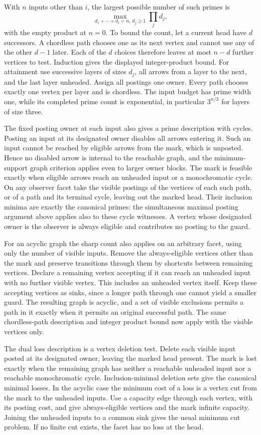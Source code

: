 With $n$ inputs other than $i$, the largest possible
number of such primes is
\[
        \max_{d_1+\cdots+d_t=n,\ d_j\ge1}\prod_j d_j ,
\]
with the empty product at $n=0$. To bound the count,
let a current head have $d$ successors. A chordless
path chooses one as its next vertex and cannot use
any of the other $d-1$ later. Each of the $d$ choices
therefore leaves at most $n-d$ further vertices to
test. Induction gives the displayed integer-product
bound. For attainment use successive layers of sizes
$d_j$, all arrows from a layer to the next, and the
last layer unheaded. Assign all postings one owner.
Every path chooses exactly one vertex per layer
and is chordless. The input budget has prime width
one, while its completed prime count is exponential,
in particular $3^{n/3}$ for layers of size three.

The fixed posting owner at each input also gives a
prime description with cycles. Posting an input at
its designated owner disables all arrows entering
it. Such an input cannot be reached by eligible
arrows from the mark, which is unposted. Hence
no disabled arrow is internal to the reachable
graph, and the minimum-support graph criterion
applies even to larger owner blocks. The mark
is feasible exactly when eligible arrows reach
an unheaded input or a monochromatic cycle.
On any observer facet take the visible postings
of the vertices of each such path, or of a path
and its terminal cycle, leaving out the marked
head. Their inclusion minima are exactly the
canonical primes: the simultaneous maximal
posting argument above applies also to these
cycle witnesses. A vertex whose designated
owner is the observer is always eligible and
contributes no posting to the guard.

For an acyclic graph the sharp count also applies
on an arbitrary facet, using only the number of
visible inputs. Remove the always-eligible vertices
other than the mark and preserve transitions through
them by shortcuts between remaining vertices.
Declare a remaining vertex accepting if it can
reach an unheaded input with no further visible
vertex. This includes an unheaded vertex itself.
Keep these accepting vertices as sinks, since a
longer path through one cannot yield a smaller
guard. The resulting graph is acyclic, and a set
of visible exclusions permits a path in it exactly
when it permits an original successful path.
The same chordless-path description and integer
product bound now apply with the visible vertices
only.

The dual loss description is a vertex deletion test.
Delete each visible input posted at its designated
owner, leaving the marked head present. The mark is
lost exactly when the remaining graph has neither
a reachable unheaded input nor a reachable
monochromatic cycle. Inclusion-minimal deletion
sets give the canonical minimal losses. In the
acyclic case the minimum cost of a loss is a
vertex cut from the mark to the unheaded inputs.
Use a capacity edge through each vertex, with
its posting cost, and give always-eligible vertices
and the mark infinite capacity. Joining the
unheaded inputs to a common sink gives the
usual minimum cut problem. If no finite cut
exists, the facet has no loss at the head.

